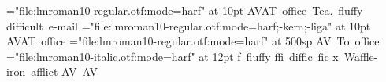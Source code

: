 \font\lm="file:lmroman10-regular.otf:mode=harf" at 10pt
\hbox{\lm AVAT office Tea. fluffy}
\hbox{\lm dif\-fi\-cult e-mail}
\font\lmnk="file:lmroman10-regular.otf:mode=harf;-kern;-liga" at 10pt
\hbox{\lmnk AVAT office}
\font\lmtiny="file:lmroman10-regular.otf:mode=harf" at 500sp
\hbox{\lmtiny AV To office}
\font\lmit="file:lmroman10-italic.otf:mode=harf" at 12pt
\hbox{\lmit f\/ fluffy\/}
\hbox{\lm f\-f\-i dif\-fi\-c fi\-c}
\hbox{\lm{}x Waffle-iron afflict}
\hbox{\lm A\hbox{}V A\vrule V}
